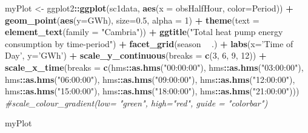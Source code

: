 \documentclass[]{article}
\newenvironment{Shaded}{\begin{snugshade}}{\end{snugshade}}
\newcommand{\KeywordTok}[1]{\textcolor[rgb]{0.13,0.29,0.53}{\textbf{#1}}}
\newcommand{\DataTypeTok}[1]{\textcolor[rgb]{0.13,0.29,0.53}{#1}}
\newcommand{\DecValTok}[1]{\textcolor[rgb]{0.00,0.00,0.81}{#1}}
\newcommand{\FloatTok}[1]{\textcolor[rgb]{0.00,0.00,0.81}{#1}}
\newcommand{\StringTok}[1]{\textcolor[rgb]{0.31,0.60,0.02}{#1}}
\newcommand{\CommentTok}[1]{\textcolor[rgb]{0.56,0.35,0.01}{\textit{#1}}}
\newcommand{\OperatorTok}[1]{\textcolor[rgb]{0.81,0.36,0.00}{\textbf{#1}}}
\newcommand{\NormalTok}[1]{#1}
\theoremstyle{definition}
\theoremstyle{definition}
\theoremstyle{definition}
\theoremstyle{remark}
\begin{document}
\begin{Shaded}
\begin{Highlighting}[]
\NormalTok{myPlot <-}\StringTok{ }\NormalTok{ggplot2}\OperatorTok{::}\KeywordTok{ggplot}\NormalTok{(sc1data, }\KeywordTok{aes}\NormalTok{(}\DataTypeTok{x =}\NormalTok{ obsHalfHour, }\DataTypeTok{color=}\NormalTok{Period)) }\OperatorTok{+}
\StringTok{  }\KeywordTok{geom_point}\NormalTok{(}\KeywordTok{aes}\NormalTok{(}\DataTypeTok{y=}\NormalTok{GWh), }\DataTypeTok{size=}\FloatTok{0.5}\NormalTok{, }\DataTypeTok{alpha =} \DecValTok{1}\NormalTok{) }\OperatorTok{+}
\StringTok{  }\KeywordTok{theme}\NormalTok{(}\DataTypeTok{text =} \KeywordTok{element_text}\NormalTok{(}\DataTypeTok{family =} \StringTok{"Cambria"}\NormalTok{)) }\OperatorTok{+}
\StringTok{  }\KeywordTok{ggtitle}\NormalTok{(}\StringTok{"Total heat pump energy consumption by time-period"}\NormalTok{) }\OperatorTok{+}
\StringTok{  }\KeywordTok{facet_grid}\NormalTok{(season }\OperatorTok{~}\StringTok{ }\NormalTok{.) }\OperatorTok{+}
\StringTok{  }\KeywordTok{labs}\NormalTok{(}\DataTypeTok{x=}\StringTok{'Time of Day'}\NormalTok{, }\DataTypeTok{y=}\StringTok{'GWh'}\NormalTok{) }\OperatorTok{+}
\StringTok{  }\KeywordTok{scale_y_continuous}\NormalTok{(}\DataTypeTok{breaks =} \KeywordTok{c}\NormalTok{(}\DecValTok{3}\NormalTok{, }\DecValTok{6}\NormalTok{, }\DecValTok{9}\NormalTok{, }\DecValTok{12}\NormalTok{)) }\OperatorTok{+}
\StringTok{  }\KeywordTok{scale_x_time}\NormalTok{(}\DataTypeTok{breaks =} \KeywordTok{c}\NormalTok{(hms}\OperatorTok{::}\KeywordTok{as.hms}\NormalTok{(}\StringTok{"00:00:00"}\NormalTok{), hms}\OperatorTok{::}\KeywordTok{as.hms}\NormalTok{(}\StringTok{"03:00:00"}\NormalTok{), hms}\OperatorTok{::}\KeywordTok{as.hms}\NormalTok{(}\StringTok{"06:00:00"}\NormalTok{),       hms}\OperatorTok{::}\KeywordTok{as.hms}\NormalTok{(}\StringTok{"09:00:00"}\NormalTok{), hms}\OperatorTok{::}\KeywordTok{as.hms}\NormalTok{(}\StringTok{"12:00:00"}\NormalTok{), }
\NormalTok{  hms}\OperatorTok{::}\KeywordTok{as.hms}\NormalTok{(}\StringTok{"15:00:00"}\NormalTok{), hms}\OperatorTok{::}\KeywordTok{as.hms}\NormalTok{(}\StringTok{"18:00:00"}\NormalTok{), hms}\OperatorTok{::}\KeywordTok{as.hms}\NormalTok{(}\StringTok{"21:00:00"}\NormalTok{))) }
  \CommentTok{#scale_colour_gradient(low= "green", high="red", guide = "colorbar")}

\NormalTok{myPlot}
\end{Highlighting}
\end{Shaded}
\end{document}

